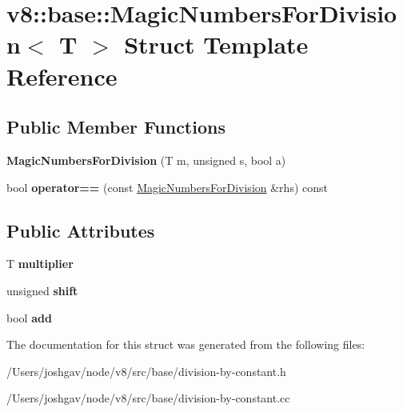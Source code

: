 \hypertarget{structv8_1_1base_1_1_magic_numbers_for_division}{}\section{v8\+:\+:base\+:\+:Magic\+Numbers\+For\+Division$<$ T $>$ Struct Template Reference}
\label{structv8_1_1base_1_1_magic_numbers_for_division}
\subsection*{Public Member Functions}
\begin{DoxyCompactItemize}
\item 
{\bfseries Magic\+Numbers\+For\+Division} (T m, unsigned s, bool a)\hypertarget{structv8_1_1base_1_1_magic_numbers_for_division_a9c8bc5972e416ee5a86d84910f656f80}{}\label{structv8_1_1base_1_1_magic_numbers_for_division_a9c8bc5972e416ee5a86d84910f656f80}

\item 
bool {\bfseries operator==} (const \hyperlink{structv8_1_1base_1_1_magic_numbers_for_division}{Magic\+Numbers\+For\+Division} \&rhs) const \hypertarget{structv8_1_1base_1_1_magic_numbers_for_division_a9ffe43b55297fa3b0ec4de29f76e34fb}{}\label{structv8_1_1base_1_1_magic_numbers_for_division_a9ffe43b55297fa3b0ec4de29f76e34fb}

\end{DoxyCompactItemize}
\subsection*{Public Attributes}
\begin{DoxyCompactItemize}
\item 
T {\bfseries multiplier}\hypertarget{structv8_1_1base_1_1_magic_numbers_for_division_a6e9c4ecc2ab471e0b7a97d83593e7410}{}\label{structv8_1_1base_1_1_magic_numbers_for_division_a6e9c4ecc2ab471e0b7a97d83593e7410}

\item 
unsigned {\bfseries shift}\hypertarget{structv8_1_1base_1_1_magic_numbers_for_division_a271ab27a80a90397aa1e254ddb06377f}{}\label{structv8_1_1base_1_1_magic_numbers_for_division_a271ab27a80a90397aa1e254ddb06377f}

\item 
bool {\bfseries add}\hypertarget{structv8_1_1base_1_1_magic_numbers_for_division_a4ab63c05067197cd03ae86661cffb0b0}{}\label{structv8_1_1base_1_1_magic_numbers_for_division_a4ab63c05067197cd03ae86661cffb0b0}

\end{DoxyCompactItemize}


The documentation for this struct was generated from the following files\+:\begin{DoxyCompactItemize}
\item 
/\+Users/joshgav/node/v8/src/base/division-\/by-\/constant.\+h\item 
/\+Users/joshgav/node/v8/src/base/division-\/by-\/constant.\+cc\end{DoxyCompactItemize}
